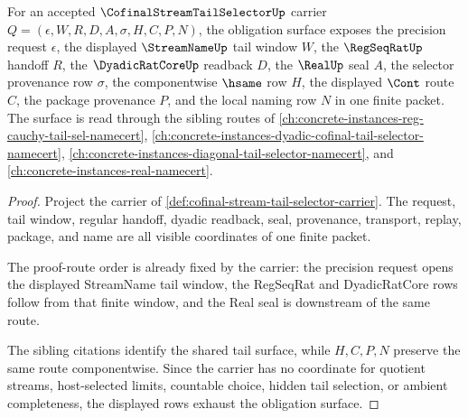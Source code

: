 \begin{theorem}
\label{thm:cofinal-stream-tail-selector-obligation-surface}
For an accepted $\CofinalStreamTailSelectorUp$ carrier $Q=(\epsilon,W,R,D,A,\sigma,H,C,P,N)$, the obligation surface exposes the precision request $\epsilon$, the displayed $\StreamNameUp$ tail window $W$, the $\RegSeqRatUp$ handoff $R$, the $\DyadicRatCoreUp$ readback $D$, the $\RealUp$ seal $A$, the selector provenance row $\sigma$, the componentwise $\hsame$ row $H$, the displayed $\Cont$ route $C$, the package provenance $P$, and the local naming row $N$ in one finite packet. The surface is read through the sibling routes of \autoref{ch:concrete-instances-reg-cauchy-tail-sel-namecert}, \autoref{ch:concrete-instances-dyadic-cofinal-tail-selector-namecert}, \autoref{ch:concrete-instances-diagonal-tail-selector-namecert}, and \autoref{ch:concrete-instances-real-namecert}.
\end{theorem}
\begin{proof}
Project the carrier of \autoref{def:cofinal-stream-tail-selector-carrier}. The request, tail window, regular handoff, dyadic readback, seal, provenance, transport, replay, package, and name are all visible coordinates of one finite packet.

The proof-route order is already fixed by the carrier: the precision request opens the displayed StreamName tail window, the RegSeqRat and DyadicRatCore rows follow from that finite window, and the Real seal is downstream of the same route.

The sibling citations identify the shared tail surface, while $H,C,P,N$ preserve the same route componentwise. Since the carrier has no coordinate for quotient streams, host-selected limits, countable choice, hidden tail selection, or ambient completeness, the displayed rows exhaust the obligation surface.
\end{proof}

